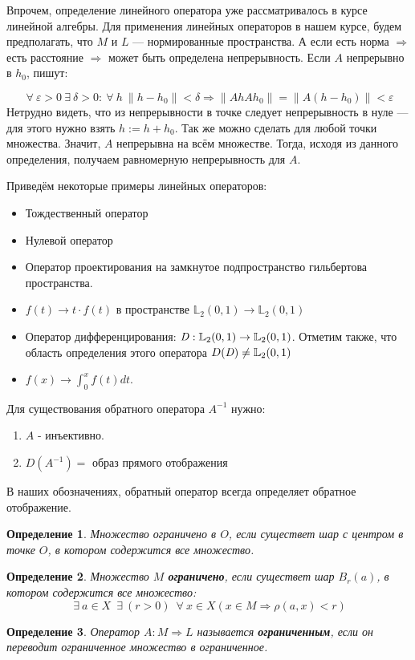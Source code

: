 \documentclass[12pt]{article}
\let\existstemp\exists
\let\foralltemp\forall
\renewcommand{\exists}{\: \existstemp \:}
\renewcommand{\forall}{\: \foralltemp \:}
\newcommand{\norm}[1]{\| #1 \|}
\newtheorem{defi}{Определение}[section]
\begin{document}
	Впрочем, определение линейного оператора уже рассматривалось в курсе линейной алгебры. Для применения линейных операторов в
	нашем курсе, будем предполагать, что $M$ и $L$ --- нормированные пространства. А если есть норма $\Rightarrow$ есть расстояние
	$\Rightarrow$ может быть определена непрерывность. Если $A$ непрерывно в $h_0$, пишут:
	
	$$ \forall \varepsilon > 0 \exists \delta > 0 : \forall h \: \norm{h - h_0} < \delta \Rightarrow \norm{Ah  Ah_0} 
	= \norm{A(h-h_0)} < \varepsilon $$
	Нетрудно видеть, что из непрерывности в точке следует непрерывность в нуле --- для этого нужно взять $h := h + h_0$. 
	Так же можно сделать для любой точки множества. Значит, $A$ непрерывна на всём множестве. Тогда, исходя из данного
	определения, получаем равномерную непрерывность для $A$.
	
	Приведём некоторые примеры линейных операторов:
	\begin{itemize}
		\item Тождественный оператор
		\item Нулевой оператор
		\item Оператор проектирования на замкнутое подпространство гильбертова пространства.
		\item $f(t) \rightarrow t \cdot f(t)$ в пространстве $\mathbb{L}_2 (0,1) \rightarrow \mathbb{L}_2 (0,1)$
		\item Оператор дифференцирования: $\text{\emph{D}}: \mathbb{L}_2 (0,1) \rightarrow \mathbb{L}_2 (0,1)$. Отметим также, что
		область определения этого оператора $D(\text{\emph{D}}) \neq \mathbb{L}_2 (0,1)$
		\item $f(x) \rightarrow \int_0^x f(t) dt$.
	\end{itemize}
	
	Для существования обратного оператора $A^{-1}$ нужно:
	\begin{enumerate}
		\item $A$ - инъективно.
		\item $D(A^{-1}) = $ образ прямого отображения
	\end{enumerate}
	В наших обозначениях, обратный оператор всегда определяет обратное отображение.
	
	\begin{defi}
		Множество ограничено в $O$, если существет шар с центром в точке $O$, в котором содержится все множество.
	\end{defi}
	\begin{defi}
		Множество $M$ \textbf{ограничено}, если существет шар $B_r(a)$, в котором содержится все множество:
		$$ \exists a \in X \; \exists (r > 0) \; \forall x \in X (x \in M \Rightarrow \rho(a, x) < r) $$
	\end{defi}
	\begin{defi}
		Оператор $A: M \Rightarrow L$ называется \textbf{ограниченным}, если он переводит ограниченное множество
		в ограниченное.
	\end{defi}
	
\end{document}
